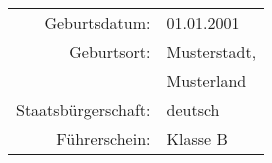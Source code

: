 \begin{sidebar}
  \begin{profile}
    \begin{tabular}{rl}
      Geburtsdatum:       & 01.01.2001   \\[3pt]
      Geburtsort:         & Musterstadt, \\[3pt]
                          & Musterland   \\[3pt]
      Staatsbürgerschaft: & deutsch      \\[3pt]
      Führerschein:       & Klasse B     \\[3pt]
    \end{tabular}
  \end{profile}
  \vspace{.5cm}
  \begin{contact}
  \end{contact}
  \vspace{.5cm}
  \begin{languages}
  \end{languages}
\end{sidebar}
